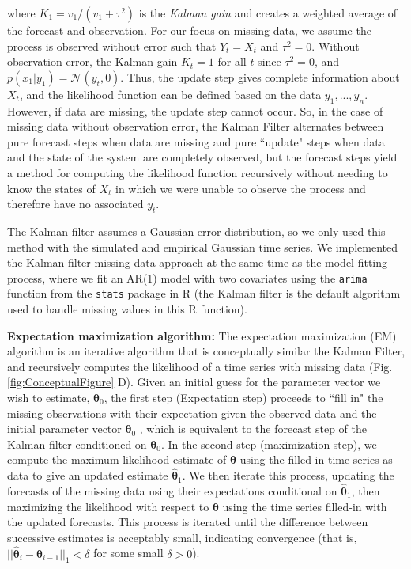 \documentclass{article}
\begin{document}
where $K_1 = v_1 / (v_1 + \tau^2)$ is the \textit{Kalman gain} and creates a weighted average of the forecast and observation. %
For our focus on missing data, we assume the process is observed without error such that $Y_t = X_t$ and $\tau^2 = 0$. Without observation error, the Kalman gain $K_t = 1$ for all $t$ since $\tau^2 = 0$, and $p(x_1 | y_1) = \mathcal{N}(y_t, 0)$. Thus, the update step gives complete information about $X_t$, and the likelihood function can be defined based on the data $y_1,...,y_n$. However, if data are missing, the update step cannot occur. So, in the case of missing data without observation error, the Kalman Filter alternates between pure forecast steps when data are missing and pure ``update" steps when data and the state of the system are completely observed, but the forecast steps yield a method for computing the likelihood function recursively without needing to know the states of $X_t$ in which we were unable to observe the process and therefore have no associated $y_t$.

The Kalman filter assumes a Gaussian error distribution, so we only used this method with the simulated and empirical Gaussian time series. We implemented the Kalman filter missing data approach at the same time as the model fitting process, where we fit an AR(1) model with two covariates using the \texttt{arima} function from the \texttt{stats} package in R \citep{r_2021} (the Kalman filter is the default algorithm used to handle missing values in this R function). 

\noindent\textbf{Expectation maximization algorithm: }The expectation maximization (EM) algorithm is an iterative algorithm that is conceptually similar the Kalman Filter, and recursively computes the likelihood of a time series with missing data (Fig. \ref{fig:ConceptualFigure} D). Given an initial guess for the parameter vector we wish to estimate, ${\bm \theta}_0$, the first step (Expectation step) proceeds to ``fill in" the missing observations with their expectation given the observed data and the initial parameter vector ${\bm \theta}_0$ %
, which is equivalent to the forecast step of the Kalman filter conditioned on ${\bm \theta}_0$. In the second step (maximization step), we compute the maximum likelihood estimate of ${\bm \theta}$ using the filled-in time series as data to give an updated estimate $\hat {\bm \theta}_1$. We then iterate this process, updating the forecasts of the missing data using their expectations conditional on $\hat {\bm \theta}_1$, then maximizing the likelihood with respect to $\bm \theta$ using the time series filled-in with the updated forecasts. This process is iterated until the difference between successive estimates is acceptably small, indicating convergence (that is, $||\hat {\bm \theta}_i - \hat {\bm \theta}_{i-1}||_1 < \delta$ for some small $\delta > 0$).
\end{document}
